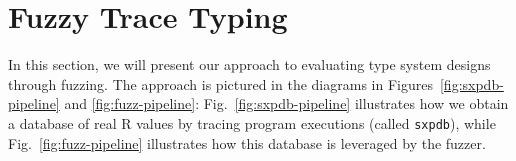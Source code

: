 \documentclass[sigplan,anonymous,review]{acmart}
\begin{document}

\section{Fuzzy Trace Typing}
\label{sec:fuzzy}

In this section, we will present our approach to evaluating type system designs through fuzzing.
The approach is pictured in the diagrams in Figures~\ref{fig:sxpdb-pipeline} and \ref{fig:fuzz-pipeline}:
Fig.~\ref{fig:sxpdb-pipeline} illustrates how we obtain a database of real R values by tracing program executions (called {\tt sxpdb}), while Fig.~\ref{fig:fuzz-pipeline} illustrates how this database is leveraged by the fuzzer.

\end{document}
